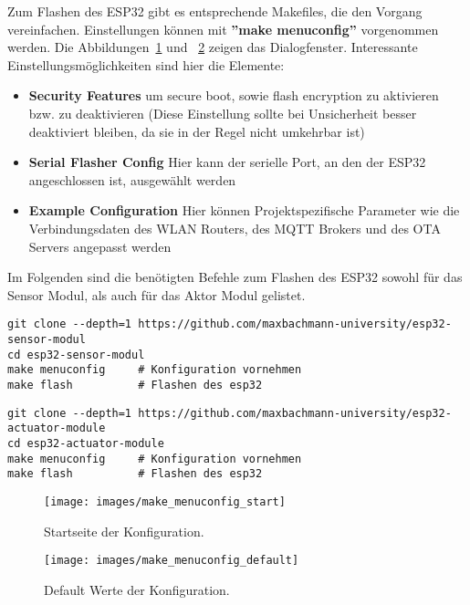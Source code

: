 Zum Flashen des ESP32 gibt es entsprechende Makefiles, die den Vorgang vereinfachen. Einstellungen können mit \textbf{''make menuconfig''} vorgenommen werden. Die Abbildungen~\ref{fig:config_start} und ~\ref{fig:config_default} zeigen das Dialogfenster.
Interessante Einstellungsmöglichkeiten sind hier die Elemente:
\begin{itemize}
	\item \textbf{Security Features} um secure boot, sowie flash encryption zu aktivieren bzw. zu deaktivieren (Diese Einstellung sollte bei Unsicherheit besser deaktiviert bleiben, da sie in der Regel nicht umkehrbar ist)
	\item \textbf{Serial Flasher Config} Hier kann der serielle Port, an den der ESP32 angeschlossen ist, ausgewählt werden
	\item \textbf{Example Configuration} Hier können Projektspezifische Parameter wie die Verbindungsdaten des WLAN Routers, des MQTT Brokers und des OTA Servers angepasst werden
\end{itemize}

Im Folgenden sind die benötigten Befehle zum Flashen des ESP32 sowohl für das Sensor Modul, als auch für das Aktor Modul gelistet.
\begin{lstlisting}
git clone --depth=1 https://github.com/maxbachmann-university/esp32-sensor-modul
cd esp32-sensor-modul
make menuconfig		# Konfiguration vornehmen
make flash			# Flashen des esp32
\end{lstlisting}

\begin{lstlisting}
git clone --depth=1 https://github.com/maxbachmann-university/esp32-actuator-module
cd esp32-actuator-module
make menuconfig		# Konfiguration vornehmen
make flash			# Flashen des esp32
\end{lstlisting}

\begin{figure}[H]
	\centering
	\texttt{[image: images/make\_menuconfig\_start]}
	\caption[Konfiguration Startseite]{Startseite der Konfiguration.}
	\label{fig:config_start}
\end{figure}

\begin{figure}[H]
	\centering
	\texttt{[image: images/make\_menuconfig\_default]}
	\caption[Konfiguration Standard]{Default Werte der Konfiguration.}
	\label{fig:config_default}
\end{figure}

